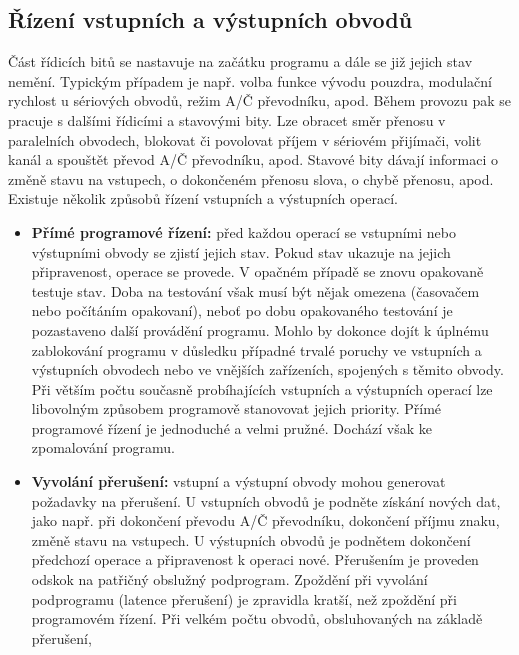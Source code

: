     \subsection{Řízení vstupních a výstupních obvodů}
      Část řídicích bitů se nastavuje na začátku programu a dále se již jejich stav nemění. 
      Typickým případem je např. volba funkce vývodu pouzdra, modulační rychlost u sériových 
      obvodů, režim A/Č převodníku, apod. Během provozu pak se pracuje s dalšími řídicími a 
      stavovými bity. Lze obracet směr přenosu v paralelních obvodech, blokovat či povolovat příjem 
      v sériovém přijímači, volit kanál a spouštět převod A/Č převodníku, apod. Stavové bity dávají 
      informaci o změně stavu na vstupech, o dokončeném přenosu slova, o chybě přenosu, apod. 
      Existuje několik způsobů řízení vstupních a výstupních operací.
      \begin{itemize}\addtolength{\itemsep}{-0.5\baselineskip}
        \item  \textbf{Přímé programové řízení:} před každou operací se vstupními nebo 
               výstupními obvody se zjistí jejich stav. Pokud stav ukazuje na jejich připravenost, 
               operace se provede. V opačném případě se znovu opakovaně testuje stav. Doba na 
               testování však musí být nějak omezena (časovačem nebo počítáním opakovaní), neboť po 
               dobu opakovaného testování je pozastaveno další provádění programu. Mohlo by dokonce 
               dojít k úplnému zablokování programu v důsledku případné trvalé poruchy ve vstupních 
               a výstupních obvodech nebo ve vnějších zařízeních, spojených s těmito obvody. Při 
               větším počtu současně probíhajících vstupních a výstupních operací lze          
               libovolným způsobem programově stanovovat jejich priority. Přímé programové řízení 
               je jednoduché a velmi pružné. Dochází však ke zpomalování programu.
        \item  \textbf{Vyvolání přerušení:} vstupní a výstupní obvody mohou generovat požadavky na  
               přerušení. U vstupních obvodů je podněte získání nových dat, jako např. při 
               dokončení převodu A/Č převodníku, dokončení příjmu znaku, změně stavu na vstupech. U 
               výstupních obvodů je podnětem dokončení předchozí operace a připravenost k operaci 
               nové. Přerušením je proveden odskok na patřičný obslužný podprogram. Zpoždění při 
               vyvolání podprogramu (latence přerušení) je zpravidla kratší, než zpoždění při 
               programovém řízení. Při velkém počtu obvodů, obsluhovaných na základě přerušení, 

\end{itemize}
